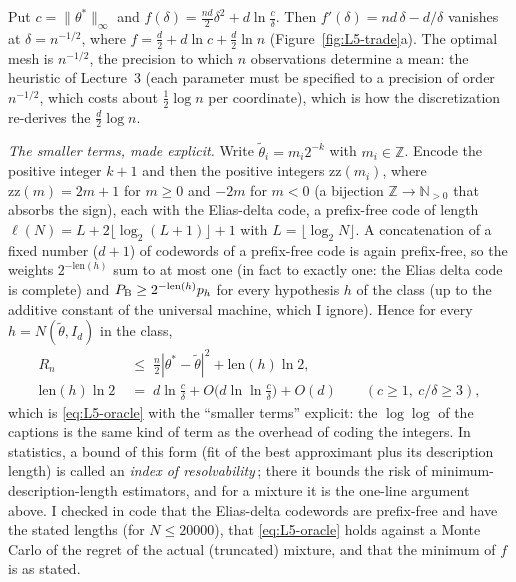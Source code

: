 \begin{beyond}
Put $c=\|\theta^*\|_\infty$ and $f(\delta)=\frac{nd}2\delta^2+d\ln\frac c\delta$. Then $f'(\delta)=nd\,\delta-d/\delta$ vanishes at $\delta=n^{-1/2}$, where $f=\frac d2+d\ln c+\frac d2\ln n$ (Figure~\ref{fig:L5-trade}a). The optimal mesh is $n^{-1/2}$, the precision to which $n$ observations determine a mean: the heuristic of Lecture~3 (each parameter must be specified to a precision of order $n^{-1/2}$, which costs about $\frac12\log n$ per coordinate), which is how the discretization re-derives the $\frac d2\log n$.

\emph{The smaller terms, made explicit.} Write $\tilde\theta_i=m_i2^{-k}$ with $m_i\in\mathbb Z$. Encode the positive integer $k+1$ and then the positive integers $\mathrm{zz}(m_i)$, where $\mathrm{zz}(m)=2m+1$ for $m\ge0$ and $-2m$ for $m<0$ (a bijection $\mathbb Z\to\mathbb N_{>0}$ that absorbs the sign), each with the Elias-delta code, a prefix-free code of length $\ell(N)=L+2\lfloor\log_2(L+1)\rfloor+1$ with $L=\lfloor\log_2N\rfloor$. A concatenation of a fixed number ($d+1$) of codewords of a prefix-free code is again prefix-free, so the weights $2^{-\mathrm{len}(h)}$ sum to at most one (in fact to exactly one: the Elias delta code is complete) and $P_{\mathrm{B}}\ge2^{-\mathrm{len}(h)}p_h$ for every hypothesis $h$ of the class (up to the additive constant of the universal machine, which I ignore). Hence for every $h=N(\tilde\theta,I_d)$ in the class,
\begin{align*}
  R_n&\;\le\;\frac n2|\theta^*-\tilde\theta|^2+\mathrm{len}(h)\ln2,\\
  \mathrm{len}(h)\ln2&\;=\;d\ln\frac c\delta+O\big(d\ln\ln\tfrac c\delta\big)+O(d)\qquad(c\ge1,\ c/\delta\ge3),
\end{align*}
which is \eqref{eq:L5-oracle} with the ``smaller terms'' explicit: the $\log\log$ of the captions is the same kind of term as the overhead of coding the integers. In statistics, a bound of this form (fit of the best approximant plus its description length) is called an \emph{index of resolvability}\,\citep{barron1991}; there it bounds the risk of minimum-description-length estimators, and for a mixture it is the one-line argument above. I checked in code that the Elias-delta codewords are prefix-free and have the stated lengths (for $N\le20000$), that \eqref{eq:L5-oracle} holds against a Monte Carlo of the regret of the actual (truncated) mixture, and that the minimum of $f$ is as stated.
\end{beyond}

